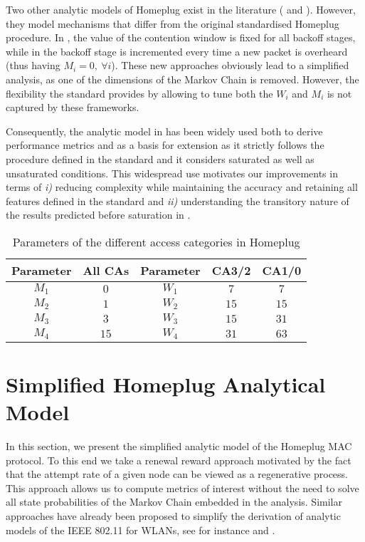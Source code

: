 \documentclass[preprint,12pt]{elsarticle}
\begin{document}
Two other analytic models of Homeplug exist in the literature (\cite{kriminger2011markov} and \cite{campista2005improving}). However, they model mechanisms that differ from the original standardised Homeplug procedure. In \cite{kriminger2011markov}, the value of the contention window is fixed for all backoff stages, while in \cite{campista2005improving} the backoff stage is incremented every time a new packet is overheard (thus having $M_i = 0,~ \forall i$). These new approaches obviously lead to a simplified analysis, as one of the dimensions of the Markov Chain is removed. However, the flexibility the standard provides by allowing to tune both the $W_i$ and $M_i$ is not captured by these frameworks.

Consequently, the analytic model in \cite{chung2006performance} has been widely used both to derive performance metrics and as a basis for extension \cite{yoon2008adaptive,koutny2011homeplug,pinero2011homeplug,koutny2013analysis,pinero2011realistic,yoon2013multichannel} as it strictly follows the procedure defined in the standard and it considers saturated as well as unsaturated conditions. This widespread use motivates our improvements in terms of \emph{i)} reducing complexity while maintaining the accuracy and retaining all features defined in the standard \cite{HomeplugStd} and \emph{ii)} understanding the transitory nature of the results predicted before saturation in \cite{chung2006performance}.

\begin{table}
\centering
\begin{tabular}{ccccc} 
Parameter & All CAs & Parameter & CA3/2 & CA1/0 \\ \hline
$M_1$ & $0$ & $W_1$ & $7$ & $7$ \\ \hline
$M_2$ & $1$ & $W_2$ & $15$ & $15$ \\ \hline
$M_3$ & $3$ & $W_3$ & $15$ & $31$ \\ \hline
$M_4$ & $15$ & $W_4$ & $31$ & $63$ \\  \hline
\end{tabular}
\caption{Parameters of the different access categories in Homeplug}\label{tbl:access_categories}
\end{table}

\section{Simplified Homeplug Analytical Model}\label{sec:model}

In this section, we present the simplified analytic model of the Homeplug MAC protocol. To this end we take a renewal reward approach \cite{kumar05,bianchi05} motivated by the fact that the attempt rate of a given node can be viewed as a regenerative process. This approach allows us to compute metrics of interest without the need to solve all state probabilities of the Markov Chain embedded in the analysis. Similar approaches have already been proposed to simplify the derivation of analytic models of the IEEE 802.11 for WLANs, see for instance \cite{medepalli2005system} and \cite{BBellalta-Eurocon2005}.  
\end{document}

